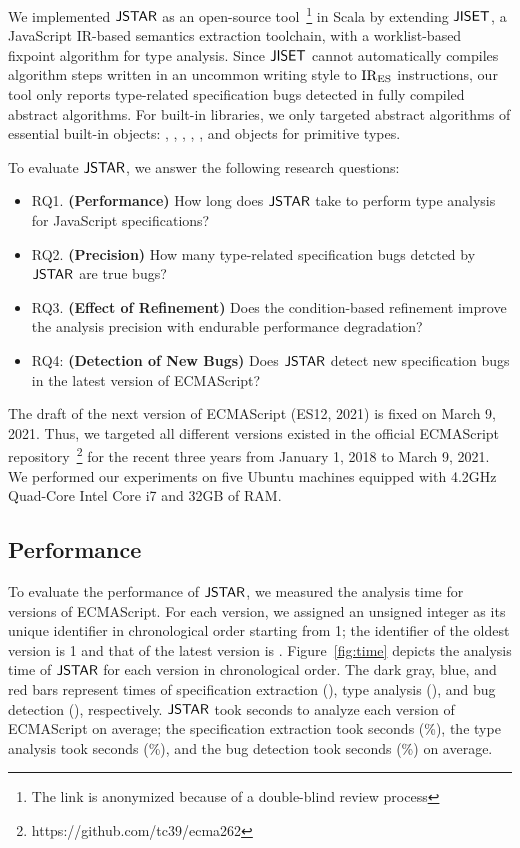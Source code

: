 We implemented $\tool$ as an open-source tool~\footnote{The link is anonymized
because of a double-blind review process} in Scala by extending $\jiset$, a
JavaScript IR-based semantics extraction toolchain, with a worklist-based
fixpoint algorithm for type analysis.  Since $\jiset$ cannot automatically
compiles algorithm steps written in an uncommon writing style to ${\text{IR}_\text{ES}}$
instructions, our tool only reports type-related specification bugs detected in
fully compiled abstract algorithms.  For built-in libraries, we only targeted
abstract algorithms of essential built-in objects: ,
, , , , and objects
for primitive types.

To evaluate $\tool$, we answer the following research questions:
\begin{itemize}
  \item RQ1. \textbf{(Performance)} How long does $\tool$ take to perform type
    analysis for JavaScript specifications?
  \item RQ2. \textbf{(Precision)} How many type-related specification bugs
    detcted by $\tool$ are true bugs?
  \item RQ3. \textbf{(Effect of Refinement)} Does the condition-based refinement
    improve the analysis precision with endurable performance degradation?
  \item RQ4: \textbf{(Detection of New Bugs)} Does $\tool$ detect new
    specification bugs in the latest version of ECMAScript?
\end{itemize}
The draft of the next version of ECMAScript (ES12, 2021) is fixed on March 9,
2021.  Thus, we targeted all different  versions existed in the
official ECMAScript repository~\footnote{https://github.com/tc39/ecma262} for
the recent three years from January 1, 2018 to March 9, 2021.  We performed our
experiments on five Ubuntu machines equipped with 4.2GHz Quad-Core Intel Core i7
and 32GB of RAM.


\subsection{Performance}

To evaluate the performance of $\tool$, we measured the analysis time for
 versions of ECMAScript.  For each version, we assigned an unsigned
integer as its unique identifier in chronological order starting from 1; the
identifier of the oldest version is 1 and that of the latest version is
.  Figure~\ref{fig:time} depicts the analysis time of $\tool$ for
each version in chronological order.  The dark gray, blue, and red bars
represent times of specification extraction (), type analysis
(), and bug detection (), respectively.  $\tool$ took
 seconds to analyze each version of ECMAScript on average; the
specification extraction took  seconds (\%), the type
analysis took  seconds (\%), and the bug detection
took  seconds (\%) on average.


